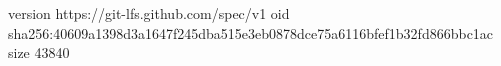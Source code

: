 version https://git-lfs.github.com/spec/v1
oid sha256:40609a1398d3a1647f245dba515e3eb0878dce75a6116bfef1b32fd866bbc1ac
size 43840
